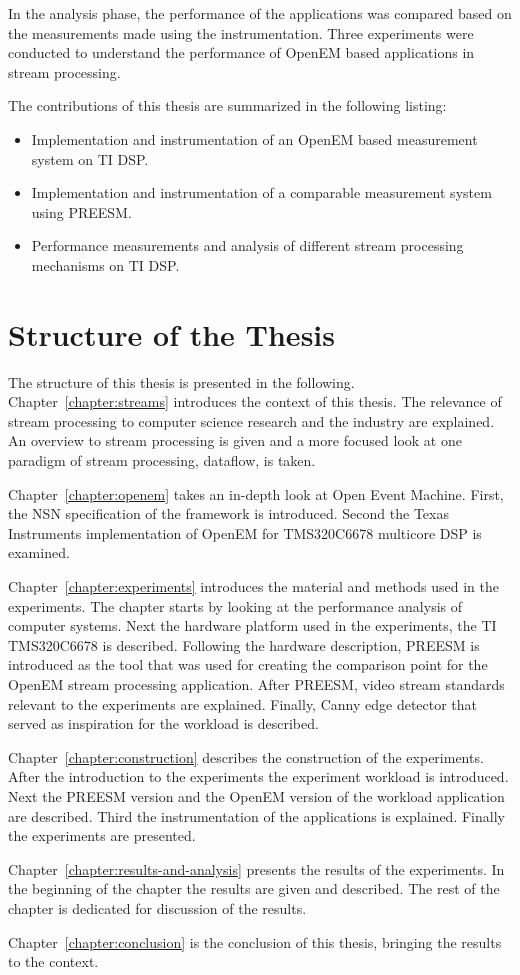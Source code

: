 In the analysis phase, the performance of the applications was compared based on the measurements made using the instrumentation. Three experiments were conducted to understand the performance of OpenEM based applications in stream processing.

The contributions of this thesis are summarized in the following listing:
\begin{itemize}
    \item Implementation and instrumentation of an OpenEM based measurement system on TI DSP.
    \item Implementation and instrumentation of a comparable measurement system using PREESM.
    \item Performance measurements and analysis of different stream processing mechanisms on TI DSP.
\end{itemize}

\section{Structure of the Thesis}
\label{section:structure}
The structure of this thesis is presented in the following. Chapter~\ref{chapter:streams} introduces the context of this thesis. The relevance of stream processing to computer science research and the industry are explained. An overview to stream processing is given and a more focused look at one paradigm of stream processing, dataflow, is taken.

Chapter~\ref{chapter:openem} takes an in-depth look at Open Event Machine. First, the NSN specification of the framework is introduced. Second the Texas Instruments implementation of OpenEM for TMS320C6678 multicore DSP is examined.

Chapter~\ref{chapter:experiments} introduces the material and methods used in the experiments. The chapter starts by looking at the performance analysis of computer systems. Next the hardware platform used in the experiments, the TI TMS320C6678 is described. Following the hardware description, PREESM is introduced as the tool that was used for creating the comparison point for the OpenEM stream processing application. After PREESM, video stream standards relevant to the experiments are explained. Finally, Canny edge detector that served as inspiration for the workload is described.

Chapter~\ref{chapter:construction} describes the construction of the experiments. After the introduction to the experiments the experiment workload is introduced. Next the PREESM version and the OpenEM version of the workload application are described. Third the instrumentation of the applications is explained. Finally the experiments are presented.

Chapter~\ref{chapter:results-and-analysis} presents the results of the experiments. In the beginning of the chapter the results are given and described. The rest of the chapter is dedicated for discussion of the results.

Chapter~\ref{chapter:conclusion} is the conclusion of this thesis, bringing the results to the context.

